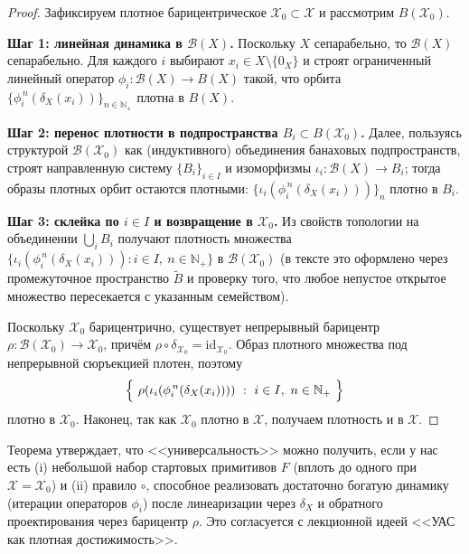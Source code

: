 \documentclass[../NDCNNAI_main.tex]{subfiles}
\begin{document}
\begin{proof}
Зафиксируем плотное барицентрическое $\mathcal{X}_0\subset\mathcal{X}$ и рассмотрим $B(\mathcal{X}_0)$.

\noindent\textbf{Шаг 1: линейная динамика в $\mathcal{B}(X)$.}
Поскольку $X$ сепарабельно, то $\mathcal{B}(X)$ сепарабельно.
Для каждого $i$ выбирают $x_i\in X\setminus\{0_X\}$ и строят ограниченный линейный оператор
$\phi_i\colon \mathcal{B}(X)\to B(X)$ такой, что орбита $\{\phi_i^{\,n}(\delta_X(x_i))\}_{n\in\mathbb{N}_+}$ плотна в $B(X)$.

\noindent\textbf{Шаг 2: перенос плотности в подпространства $B_i\subset B(\mathcal{X}_0)$.}
Далее, пользуясь структурой $\mathcal{B}(\mathcal{X}_0)$ как (индуктивного) объединения банаховых подпространств,
строят направленную систему $\{B_i\}_{i\in I}$ и изоморфизмы $\iota_i\colon \mathcal{B}(X)\to B_i$;
тогда образы плотных орбит остаются плотными:
$\{\iota_i(\phi_i^{\,n}(\delta_X(x_i)))\}_n$ плотно в $B_i$.

\noindent\textbf{Шаг 3: склейка по $i\in I$ и возвращение в $\mathcal{X}_0$.}
Из свойств топологии на объединении $\bigcup_i B_i$ получают плотность множества
$\{\iota_i(\phi_i^{\,n}(\delta_X(x_i))) : i\in I,\ n\in\mathbb{N}_+\}$ в $\mathcal{B}(\mathcal{X}_0)$
(в тексте это оформлено через промежуточное пространство $\widetilde{B}$ и проверку того,
что любое непустое открытое множество пересекается с указанным семейством).

Поскольку $\mathcal{X}_0$ барицентрично, существует непрерывный барицентр
$\rho\colon\mathcal{B}(\mathcal{X}_0)\to\mathcal{X}_0$, причём $\rho\circ \delta_{\mathcal{X}_0}=\mathrm{id}_{\mathcal{X}_0}$.
Образ плотного множества под непрерывной сюръекцией плотен, поэтому
\[
\Bigl\{\ \rho(\iota_i(\phi_i^{\,n}(\delta_X(x_i))))\ :\ i\in I,\ n\in\mathbb{N}_+\ \Bigr\}
\]
плотно в $\mathcal{X}_0$.
Наконец, так как $\mathcal{X}_0$ плотно в $\mathcal{X}$, получаем плотность и в $\mathcal{X}$.
\end{proof}

\begin{remark}
Теорема утверждает, что <<универсальность>> можно получить,
если у нас есть (i) небольшой набор стартовых примитивов $F$ (вплоть до одного при $\mathcal{X}=\mathcal{X}_0$)
и (ii) правило $\circ$, способное реализовать достаточно богатую динамику (итерации операторов $\phi_i$)
после линеаризации через $\delta_X$ и обратного проектирования через барицентр $\rho$.
Это согласуется с лекционной идеей <<УАС как плотная достижимость>>.
\end{remark}
\end{document}
